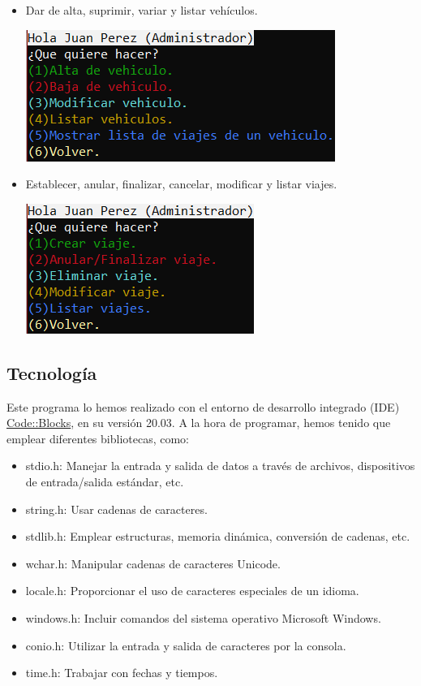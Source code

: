 \begin{itemize}
\begin{itemize}
\begin{center}
    \end{center}
    \item Dar de alta, suprimir, variar y listar vehículos.
    \begin{center}
      \includegraphics[]{FOTOS/menuAdminVehiculo.png}
    \end{center}
    \item Establecer, anular, finalizar, cancelar, modificar y listar viajes.
    \begin{center}
      \includegraphics[]{FOTOS/menuAdminViaje.png}
    \end{center}
  \end{itemize}
\end{itemize}

\newpage

\subsection{Tecnología}

Este programa lo hemos realizado con el entorno de desarrollo integrado (IDE) \href{https://www.codeblocks.org/}{Code::Blocks}, en su versión 20.03.
A la hora de programar, hemos tenido que emplear diferentes bibliotecas, como:
\begin{itemize}
  \item stdio.h: Manejar la entrada y salida de datos a través de archivos, dispositivos de entrada/salida estándar, etc.
  \item string.h: Usar cadenas de caracteres.
  \item stdlib.h: Emplear estructuras, memoria dinámica, conversión de cadenas, etc.
  \item wchar.h: Manipular cadenas de caracteres Unicode.
  \item locale.h: Proporcionar el uso de caracteres especiales de un idioma.
  \item windows.h: Incluir comandos del sistema operativo Microsoft Windows.
  \item conio.h: Utilizar la entrada y salida de caracteres por la consola.
  \item time.h: Trabajar con fechas y tiempos.
\end{itemize}


